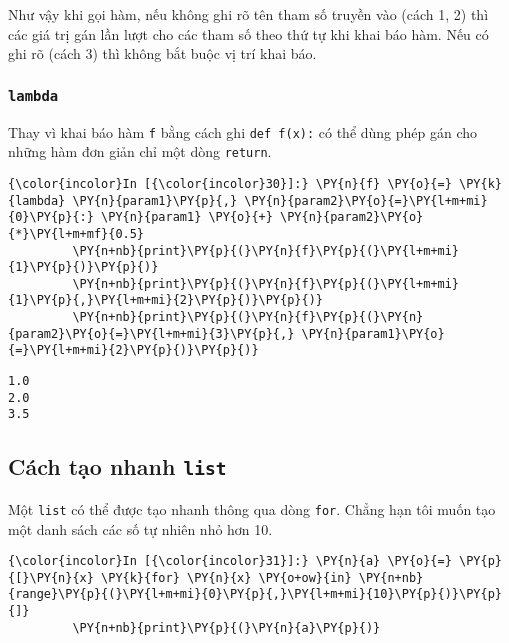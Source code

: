     Như vậy khi gọi hàm, nếu không ghi rõ tên tham số truyền vào (cách 1, 2)
thì các giá trị gán lần lượt cho các tham số theo thứ tự khi khai báo
hàm. Nếu có ghi rõ (cách 3) thì không bắt buộc vị trí khai báo.

\subsubsection{\texorpdfstring{\texttt{lambda}}{lambda}}\label{lambda}

Thay vì khai báo hàm \texttt{f} bằng cách ghi \texttt{def\ f(x):} có thể
dùng phép gán cho những hàm đơn giản chỉ một dòng \texttt{return}.

    
\begin{Verbatim}[commandchars=\\\{\}]
{\color{incolor}In [{\color{incolor}30}]:} \PY{n}{f} \PY{o}{=} \PY{k}{lambda} \PY{n}{param1}\PY{p}{,} \PY{n}{param2}\PY{o}{=}\PY{l+m+mi}{0}\PY{p}{:} \PY{n}{param1} \PY{o}{+} \PY{n}{param2}\PY{o}{*}\PY{l+m+mf}{0.5}
         \PY{n+nb}{print}\PY{p}{(}\PY{n}{f}\PY{p}{(}\PY{l+m+mi}{1}\PY{p}{)}\PY{p}{)}
         \PY{n+nb}{print}\PY{p}{(}\PY{n}{f}\PY{p}{(}\PY{l+m+mi}{1}\PY{p}{,}\PY{l+m+mi}{2}\PY{p}{)}\PY{p}{)}
         \PY{n+nb}{print}\PY{p}{(}\PY{n}{f}\PY{p}{(}\PY{n}{param2}\PY{o}{=}\PY{l+m+mi}{3}\PY{p}{,} \PY{n}{param1}\PY{o}{=}\PY{l+m+mi}{2}\PY{p}{)}\PY{p}{)}
\end{Verbatim}
    

    \begin{Verbatim}[commandchars=\\\{\}]
1.0
2.0
3.5

    \end{Verbatim}

    \subsection{\texorpdfstring{Cách tạo nhanh
\texttt{list}}{Cách tạo nhanh list}}\label{cuxe1ch-tux1ea1o-nhanh-list}

    Một \texttt{list} có thể được tạo nhanh thông qua dòng \texttt{for}.
Chẳng hạn tôi muốn tạo một danh sách các số tự nhiên nhỏ hơn 10.

    
\begin{Verbatim}[commandchars=\\\{\}]
{\color{incolor}In [{\color{incolor}31}]:} \PY{n}{a} \PY{o}{=} \PY{p}{[}\PY{n}{x} \PY{k}{for} \PY{n}{x} \PY{o+ow}{in} \PY{n+nb}{range}\PY{p}{(}\PY{l+m+mi}{0}\PY{p}{,}\PY{l+m+mi}{10}\PY{p}{)}\PY{p}{]}
         \PY{n+nb}{print}\PY{p}{(}\PY{n}{a}\PY{p}{)}
\end{Verbatim}
    

